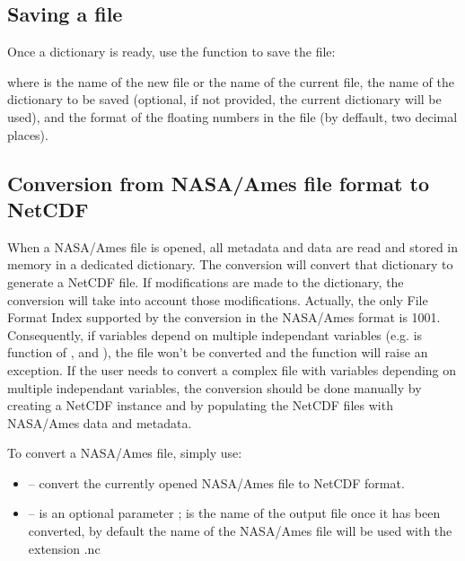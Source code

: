 \documentclass[a4paper,10pt,openany,english]{sphinxmanual}
\begin{document}
\subsection{Saving a file}
\label{tutorial:saving-a-file}
Once a dictionary is ready, use the  function to save the file:

\begin{sphinxVerbatim}[commandchars=\\\{\}]
    
\end{sphinxVerbatim}

where  is the name of the new file or the name of the current file,  the name of the dictionary to be saved (optional, if not provided, the current dictionary will be used), and  the format of the floating numbers in the file (by deffault, two decimal places).


\subsection{Conversion from NASA/Ames file format to NetCDF}
\label{tutorial:conversion-from-nasa-ames-file-format-to-netcdf}
When a NASA/Ames file is opened, all metadata and data are read and stored in memory in a dedicated dictionary. The conversion will convert that dictionary to generate a NetCDF file. If modifications are made to the dictionary, the conversion will take into account those modifications. Actually, the only File Format Index supported by the conversion in the NASA/Ames format is 1001. Consequently, if variables depend on multiple independant variables (e.g.  is function of ,  and ), the file won't be converted and the function will raise an exception. If the user needs to convert a complex file with variables depending on multiple independant variables, the conversion should be done manually by creating a NetCDF instance and by populating the NetCDF files with NASA/Ames data and metadata.

To convert a NASA/Ames file, simply use:
\begin{itemize}
\item {} 
 -- convert the currently opened NASA/Ames file to NetCDF format.

\item {} 
 --  is an optional parameter ;  is the name of the output file once it has been converted, by default the name of the NASA/Ames file will be used with the extension .nc

\end{itemize}
\end{document}
